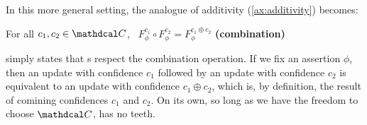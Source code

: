 In this more general setting, the analogue of additivity (\cref{ax:additivity}) becomes:
\begin{CFaxioms}
	\item For all $c_1, c_2 \in \confdom$,~
		$F^{c_1}_\phi \circ F^{c_2}_\phi = F^{c_1 \oplus c_2}_\phi$
		\hfill \textbf{(combination)} \label{ax:gen-combine}
\end{CFaxioms}
 simply states that \cofunc s respect the combination operation.
If we fix an assertion $\phi$, then an update with confidence $c_1$ followed by an update with confidence $c_2$ is equivalent to an update with confidence $c_1 \oplus c_2$, which is, by definition, the result of comining confidences $c_1$ and $c_2$.
On its own, so long as we have the freedom to choose $\confdom$,  has no teeth.



